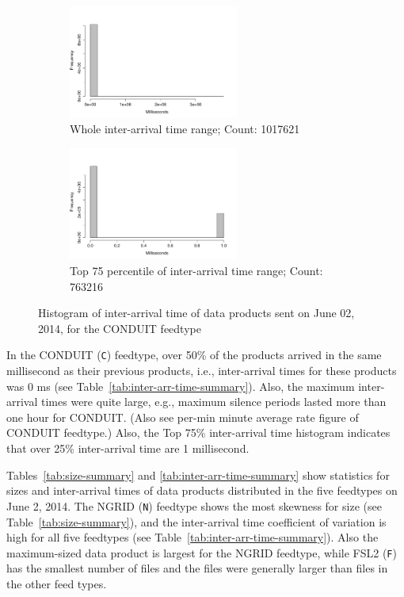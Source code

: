 \begin{figure}
\centering
    \begin{subfigure}{0.5\linewidth}
        \centering
        \includegraphics[width=2.2in]{figures/Inter-hist-CONDUIT0602.pdf}
        \caption{Whole inter-arrival time range; Count: 1017621}
        \label{CONDUIT_Inter_Whole}
    \end{subfigure}\hfill
    \begin{subfigure}{0.5\linewidth}
	\centering
    \includegraphics[width=2.2in]{figures/Inter-hist-CONDUIT0602-TOP75.pdf}
        \caption{Top 75 percentile of inter-arrival time range; Count: 763216}
        \label{CONDUIT_Inter_75}
    \end{subfigure}\hfill
    \caption{Histogram of inter-arrival time of data products sent on June 02, 2014, for the CONDUIT feedtype}
    \label{CONDUIT_time}
\end{figure}

In the CONDUIT (\texttt{C}) feedtype, over 50\% of the products arrived in the same millisecond as their previous products, i.e., inter-arrival times for
these products was 0 ms (see Table~\ref{tab:inter-arr-time-summary}). Also, the maximum inter-arrival times were
quite large, e.g., maximum silence periods lasted more
than one hour for CONDUIT. (Also see per-min minute average rate figure of CONDUIT feedtype.)
Also, the Top 75\% inter-arrival time histogram indicates that over 25\% inter-arrival time are 1 millisecond.



Tables~\ref{tab:size-summary} and \ref{tab:inter-arr-time-summary} show statistics for sizes and inter-arrival times of data products
distributed in the five feedtypes on June 2, 2014. The NGRID (\texttt{N}) feedtype shows the most skewness for size (see Table~\ref{tab:size-summary}), and the inter-arrival time
coefficient of variation is high for all five feedtypes (see Table~\ref{tab:inter-arr-time-summary}).
Also the maximum-sized data product
is largest for the NGRID feedtype, while FSL2 (\texttt{F}) has the smallest number
of files and the files were generally larger than files in the other feed types.

